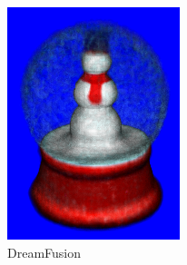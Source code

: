 \begin{figure}[ht]
    \centering
    \small
    \begin{subfigure}[b]{0.23\textwidth}
        \centering
        \includegraphics[width=\textwidth]{figures/subjective/dreamfusion_globe_10000_part1.png}
        \vspace{0.1cm}
        \caption{DreamFusion}
    \end{subfigure}
    \begin{subfigure}[b]{0.188\textwidth}
        \centering

\end{subfigure}
\end{figure}

